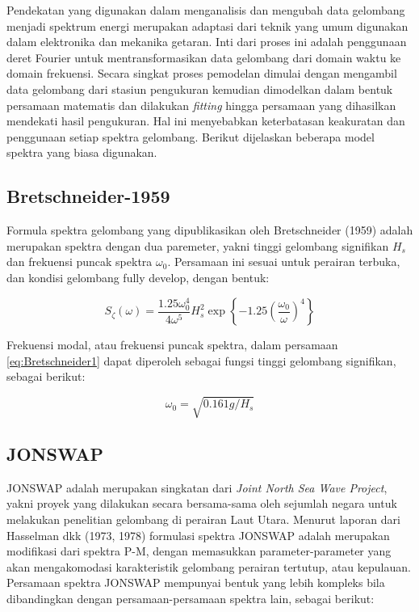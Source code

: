 Pendekatan yang digunakan dalam menganalisis dan mengubah data gelombang menjadi spektrum energi merupakan adaptasi dari teknik yang umum digunakan dalam elektronika dan mekanika getaran. Inti dari proses ini adalah penggunaan deret Fourier untuk mentransformasikan data gelombang dari domain waktu ke domain frekuensi. Secara singkat proses pemodelan dimulai dengan mengambil data gelombang dari stasiun pengukuran kemudian dimodelkan dalam bentuk persamaan matematis dan dilakukan \emph{fitting} hingga persamaan yang dihasilkan mendekati hasil pengukuran. Hal ini menyebabkan keterbatasan keakuratan dan penggunaan setiap spektra gelombang. Berikut dijelaskan beberapa model spektra yang biasa digunakan.

\subsection{Bretschneider-1959}
\label{subsec:Bretschneider}

Formula spektra gelombang yang dipublikasikan oleh Bretschneider (1959) adalah merupakan spektra dengan dua paremeter, yakni tinggi gelombang signifikan $H_s$ dan frekuensi puncak spektra $\omega_0$. Persamaan ini sesuai untuk perairan terbuka, dan kondisi gelombang fully develop, dengan bentuk:

\begin{equation}
S_\zeta(\omega) = \frac{1.25 \omega_0^4}{4 \omega^5} H_s^2 \exp\left\{-1.25\left(\frac{\omega_0}{\omega}\right)^4\right\}
\label{eq:Bretschneider1}
\end{equation}

Frekuensi modal, atau frekuensi puncak spektra, dalam persamaan \eqref{eq:Bretschneider1} dapat diperoleh sebagai fungsi tinggi gelombang signifikan, sebagai berikut:

\begin{equation}
\omega_0 = \sqrt{0.161 g / H_s}
\end{equation}

\subsection{JONSWAP}
\label{JONSWAP}

JONSWAP adalah merupakan singkatan dari \textit{Joint North Sea Wave Project}, yakni proyek yang dilakukan secara bersama-sama oleh sejumlah negara untuk melakukan penelitian gelombang di perairan Laut Utara. Menurut laporan dari Hasselman dkk (1973, 1978) formulasi spektra JONSWAP adalah merupakan modifikasi dari spektra P-M, dengan memasukkan parameter-parameter yang akan mengakomodasi karakteristik gelombang perairan tertutup, atau kepulauan. Persamaan spektra JONSWAP mempunyai bentuk yang lebih kompleks bila dibandingkan dengan persamaan-persamaan spektra lain, sebagai berikut:


